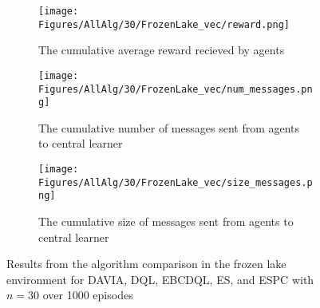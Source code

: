 \begin{figure}
    \centering
    \begin{subfigure}{0.5\textwidth}
        \centering
        \texttt{[image: Figures/AllAlg/30/FrozenLake\_vec/reward.png]}
        \caption{The cumulative average reward recieved by agents}
        \label{fig:AlgsFLReward}
    \end{subfigure}
    \begin{subfigure}{0.5\textwidth}
        \centering
        \texttt{[image: Figures/AllAlg/30/FrozenLake\_vec/num\_messages.png]}
        \caption{The cumulative number of messages sent from agents to central learner}
        \label{fig:AlgsFLNumMessages}
    \end{subfigure}
    \begin{subfigure}{0.5\textwidth}
        \centering
        \texttt{[image: Figures/AllAlg/30/FrozenLake\_vec/size\_messages.png]}
        \caption{The cumulative size of messages sent from agents to central learner}
        \label{fig:AlgsFLSizeMessages}
    \end{subfigure}
    \caption{Results from the algorithm comparison in the frozen lake environment for DAVIA, DQL, EBCDQL, ES, and ESPC with $n=30$ over 1000 episodes}
    \label{fig:AlgsFL}
\end{figure}

